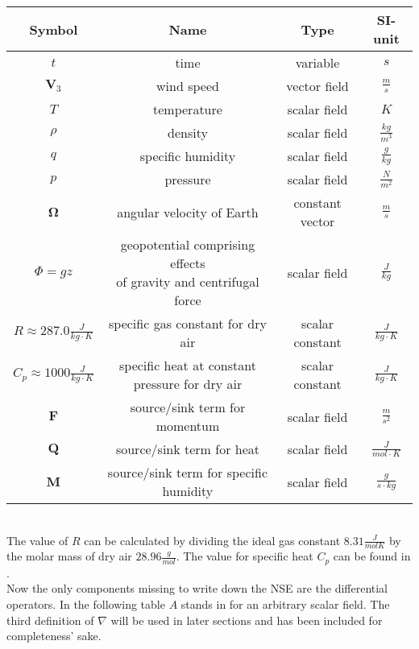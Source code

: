 \begin{tabular}{c|c|c|c}
\hline
Symbol & Name & Type & SI-unit \\ 
\hline 
$t$ & time & variable & $s$ \\
\hline 
$\textbf{V}_3$ & wind speed & vector field & $\frac{m}{s}$ \\
\hline 
$T$ & temperature & scalar field & $K$ \\
\hline 
$\rho$ & density & scalar field & $\frac{kg}{m^3}$ \\
\hline 
$q$ & specific humidity & scalar field & $\frac{g}{kg}$ \\
\hline 
$p$ & pressure & scalar field & $\frac{N}{m^2}$ \\
\hline 
$\boldsymbol{\Omega}$ & angular velocity of Earth & constant vector & $\frac{m}{s}$ \\
\hline 
$\Phi = gz$ & \makecell{geopotential comprising effects\\ of gravity and centrifugal force} & scalar field & $\frac{J}{kg}$ \\
\hline 
$R \approx 287.0 \frac{J}{kg\cdot K}$ & specific gas constant for dry air & scalar constant & $\frac{J}{kg\cdot K}$ \\ 
\hline 
$C_p \approx 1000 \frac{J}{kg\cdot K}$ & \makecell{specific heat at constant \\pressure for dry air} & scalar constant & $\frac{J}{kg\cdot K}$ \\ 
\hline 
$\textbf{F}$ & source/sink term for momentum & scalar field & $\frac{m}{s^2}$ \\ 
\hline 
$\textbf{Q}$ & source/sink term for heat & scalar field & $\frac{J}{mol\cdot K}$ \\ 
\hline 
$\textbf{M}$ & source/sink term for specific humidity & scalar field & $\frac{g}{s\cdot kg}$ \\ 
\end{tabular}
\\
The value of $R$ can be calculated by dividing the ideal gas constant $8.31\frac{J}{mol K}$\cite{mohr2008codata} by the molar mass of dry air $28.96\frac{g}{mol}$\cite{langeheinecke1993thermodynamik}.
The value for specific heat $C_p$ can be found in \cite{beckett1955tables}.
\\

Now the only components missing to write down the NSE are the differential operators.
In the following table $A$ stands in for an arbitrary scalar field.
The third definition of $\nabla$ will be used in later sections and has been included for completeness' sake.

